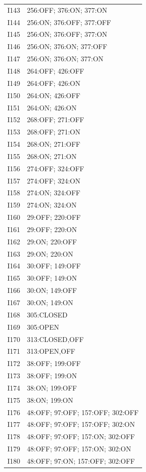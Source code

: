 {\begin{longtable}{lp{.85\linewidth}}
I143 & 256:OFF; 376:ON; 377:ON \\
I144 & 256:ON; 376:OFF; 377:OFF \\
I145 & 256:ON; 376:OFF; 377:ON \\
I146 & 256:ON; 376:ON; 377:OFF \\
I147 & 256:ON; 376:ON; 377:ON \\
I148 & 264:OFF; 426:OFF \\
I149 & 264:OFF; 426:ON \\
I150 & 264:ON; 426:OFF \\
I151 & 264:ON; 426:ON \\
I152 & 268:OFF; 271:OFF \\
I153 & 268:OFF; 271:ON \\
I154 & 268:ON; 271:OFF \\
I155 & 268:ON; 271:ON \\
I156 & 274:OFF; 324:OFF \\
I157 & 274:OFF; 324:ON \\
I158 & 274:ON; 324:OFF \\
I159 & 274:ON; 324:ON \\
I160 & 29:OFF; 220:OFF \\
I161 & 29:OFF; 220:ON \\
I162 & 29:ON; 220:OFF \\
I163 & 29:ON; 220:ON \\
I164 & 30:OFF; 149:OFF \\
I165 & 30:OFF; 149:ON \\
I166 & 30:ON; 149:OFF \\
I167 & 30:ON; 149:ON \\
I168 & 305:CLOSED \\
I169 & 305:OPEN \\
I170 & 313:CLOSED,OFF \\
I171 & 313:OPEN,OFF \\
I172 & 38:OFF; 199:OFF \\
I173 & 38:OFF; 199:ON \\
I174 & 38:ON; 199:OFF \\
I175 & 38:ON; 199:ON \\
I176 & 48:OFF; 97:OFF; 157:OFF; 302:OFF \\
I177 & 48:OFF; 97:OFF; 157:OFF; 302:ON \\
I178 & 48:OFF; 97:OFF; 157:ON; 302:OFF \\
I179 & 48:OFF; 97:OFF; 157:ON; 302:ON \\
I180 & 48:OFF; 97:ON; 157:OFF; 302:OFF \\

\end{longtable}}
